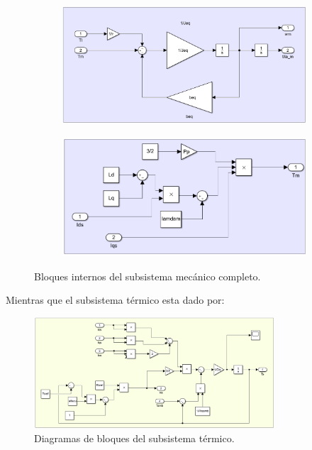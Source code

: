 \documentclass{article}
\begin{document}
\begin{figure}[H]
    \centering
    \begin{subfigure}[b]{0.45\textwidth}
        \centering
        \includegraphics[width=1\textwidth]{sub_mecanico2.png}
    \end{subfigure}
    \begin{subfigure}[b]{0.45\textwidth}
        \centering
        \includegraphics[width=1\textwidth]{sub_mecanico3.png}
    \end{subfigure}
    \caption{Bloques internos del subsistema mecánico completo.}
\end{figure}

Mientras que el subsistema térmico esta dado por:

\begin{figure}[H]
    \centering
    \includegraphics[width=0.8\textwidth]{sub_termico.png}
    \caption{Diagramas de bloques del subsistema térmico.}
\end{figure}
\end{document}
